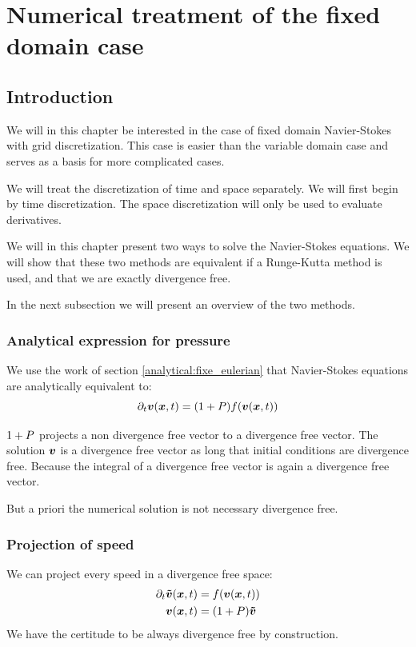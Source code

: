 \chapter{Numerical treatment of the fixed domain case}
\minitoc

\section{Introduction}

We will in this chapter be interested in the case of fixed domain Navier-Stokes with grid discretization.
This case is easier than the variable domain case and serves as a basis for more complicated cases.

We will treat the discretization of time and space separately.
We will first begin by time discretization.
The space discretization will only be used to evaluate derivatives.

We will in this chapter present two ways to solve the Navier-Stokes equations.
We will show that these two methods are equivalent if a Runge-Kutta method is used,
and that we are exactly divergence free.

In the next subsection we will present an overview of the two methods.

\subsection{Analytical expression for pressure}
\label{fixed:analytical}

We use the work of section \ref{analytical:fixe_eulerian} that Navier-Stokes equations are analytically equivalent to:
\begin{equation}
  \partial_t {\boldsymbol {v}}({\boldsymbol {x}} ,t)=(1+P)f({\boldsymbol {v}}({\boldsymbol {x}},t))
\end{equation}

$1+P$ projects a non divergence free vector to a divergence free vector.
The solution ${\boldsymbol {v}}$ is a divergence free vector as long that initial conditions are divergence free. Because the integral of a divergence free vector is again a divergence free vector.

But a priori the numerical solution is not necessary divergence free.

\subsection{Projection of speed}
\label{fixed:proj}

We can project every speed in a divergence free space:
\begin{subequations}
\begin{align}
  \partial_t {\boldsymbol {\tilde{v}}}({\boldsymbol {x}} ,t)&=f({\boldsymbol {v}}({\boldsymbol {x}},t))\\
  {\boldsymbol {v}}({\boldsymbol {x}},t)&=(1+P){\boldsymbol {\tilde{v}}}
\end{align}
\end{subequations}
We have the certitude to be always divergence free by construction.

